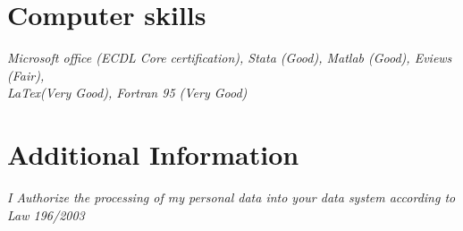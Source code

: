 \documentclass[10pt]{article} %
\begin{document}
\section{Computer skills}
\textit{Microsoft office (ECDL Core certification), Stata (Good), Matlab (Good), Eviews (Fair),\\ LaTex(Very Good), Fortran 95 (Very Good)}



\section{Additional Information}


\textit{I Authorize the processing of my personal data into your data system according to Law 196/2003}\\


\end{document}
